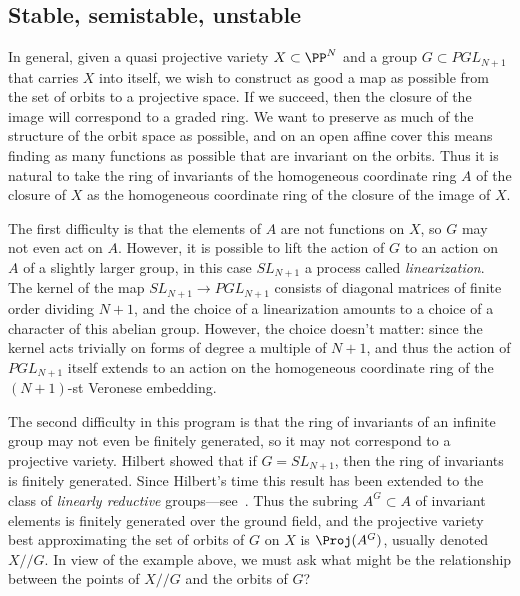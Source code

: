 \subsection{Stable, semistable, unstable}

In general, given a quasi projective variety $X \subset \PP^N$ and a group $G \subset PGL_{N+1}$ that carries $X$ into itself, we wish to construct as good a map as possible from the set of orbits
to a projective space. If we succeed, then the closure of the
image will correspond to a graded ring. We want to preserve as much of the structure of the orbit space as possible, and on an open affine cover
this means finding as many functions as possible that are invariant on the orbits. Thus it is natural to take the ring of invariants
of the homogeneous coordinate ring $A$ of the closure of $X$ as the homogeneous coordinate ring of the closure
of the image of $X$. 

The first difficulty is that the elements of $A$ are not functions on $X$, so $G$ may not even act on $A$. However, 
it is possible to lift the action of $G$ to an action on $A$ of a slightly larger group, in this case
$SL_{N+1}$ a process called \emph{linearization}. The kernel of the map $SL_{N+1} \to PGL_{N+1}$ consists of diagonal matrices of finite order dividing $N+1$, and the choice of
a linearization amounts to a choice of a character of this abelian group. However, the choice doesn't matter: since the kernel acts trivially on forms of degree a multiple
of $N+1$, and thus the action of $PGL_{N+1}$ itself  extends to an action on the homogeneous coordinate ring of the $(N+1)$-st Veronese embedding. 

The second difficulty in this program is that the ring of invariants of an infinite group may not even be finitely generated,
so it may not correspond to a projective variety. Hilbert showed that if $G= SL_{N+1}$, then the ring of invariants
is finitely generated. Since Hilbert's time this result has been extended to the class of 
\emph{linearly reductive} groups---see~\cite{MR0382294}.
Thus the subring $A^G \subset A$ of invariant elements is finitely generated over the ground field, and the projective variety best approximating the set of orbits of $G$ on $X$ 
is $\Proj(A^G)$, usually denoted $X//G$. In view of the example above, we must ask what might be
the relationship between the points of $X//G$ and the orbits of $G$? 

